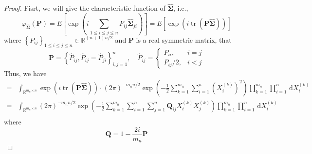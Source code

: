 \begin{proof}
    Fisrt, we will give the characteristic function of $\widehat{\boldsymbol{\Sigma}}$, i.e.,
    \begin{equation*}
        \varphi_{\widehat{\boldsymbol{\Sigma}}}\left(\mathbf{P}\right)=E\left[\exp\left(i\sum_{1\leq i\leq j\leq n}P_{ij}\widehat{\boldsymbol{\Sigma}}_{ji}\right)\right]=E\left[\exp\left(i\operatorname{tr}\left(\mathbf{P}\widehat{\boldsymbol{\Sigma}}\right)\right)\right]
    \end{equation*}
    where $\left\{P_{ij}\right\}_{1\leq i\leq j\leq n}\in\mathbb{R}^{(n+1)n/2}$ and $\mathbf{P}$ is a real symmetric matrix, that
    \begin{equation*}
        \mathbf{P}=\left\{\widehat{P}_{ij},\widehat{P}_{ij}=\widehat{P}_{ji}\right\}_{i,j=1}^{n},\quad\widehat{P}_{ij}=\begin{cases}P_{ii}, & i=j \\ P_{ij} / 2, & i<j \end{cases}
    \end{equation*}
    Thus, we have
    \begin{equation*}
        \begin{aligned}
            = & \int_{\mathbb{R}^{m_{n}\times n}}\exp\left(i\operatorname{tr}\left(\mathbf{P}\widehat{\boldsymbol{\Sigma}}\right)\right)\cdot(2\pi)^{-m_{n}n/2}\exp\left(-\frac{1}{2}\sum_{k=1}^{m_{n}}\sum_{i=1}^{n}\left(X_{i}^{(k)}\right)^{2}\right)\prod_{k=1}^{m_{n}}\prod_{i=1}^{n}\,\mathrm{d}X_{i}^{(k)} \\
            = & \int_{\mathbb{R}^{m_{n}\times n}}(2\pi)^{-m_{n}n/2}\exp\left(-\frac{1}{2}\sum_{k=1}^{m_{n}}\sum_{i=1}^{n}\sum_{j=1}^{n}\mathbf{Q}_{ij}X_{i}^{(k)}X_{j}^{(k)}\right)\prod_{k=1}^{m_{n}}\prod_{i=1}^{n}\,\mathrm{d}X_{i}^{(k)}                                                                      \\
        \end{aligned}
    \end{equation*}
    where
    \begin{equation*}
        \mathbf{Q}=1-\frac{2i}{m_{n}}\mathbf{P}
    \end{equation*}


\end{proof}
